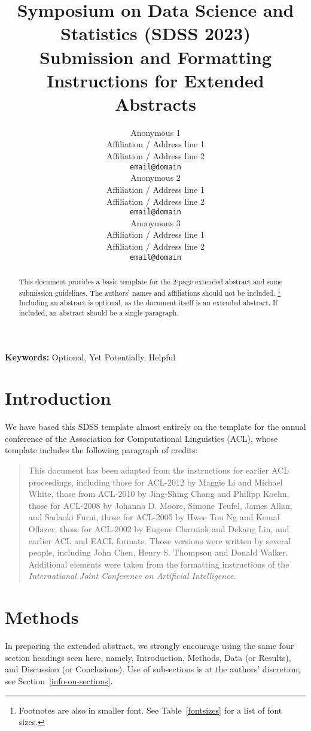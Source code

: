 \documentclass[10pt]{article}
\title{Symposium on Data Science and Statistics (SDSS 2023) \\
Submission and Formatting Instructions for Extended Abstracts}
\author{
  Anonymous 1 \\
  Affiliation / Address line 1 \\
  Affiliation / Address line 2 \\
  {\tt email@domain} \\\And
 Anonymous 2 \\
  Affiliation / Address line 1 \\
  Affiliation / Address line 2 \\
  {\tt email@domain} \\\And
  Anonymous 3 \\
  Affiliation / Address line 1 \\
  Affiliation / Address line 2 \\
  {\tt email@domain} \\}
\date{}
\begin{document}
\maketitle
\begin{abstract}
This document provides a basic template for the 2-page extended abstract
and some submission guidelines. The authors' names and affiliations should not be included. \footnote{Footnotes are also in smaller font.
See Table~\ref{fontsizes} for a list of font sizes.}
Including an abstract is optional, as the document itself is an extended abstract.
If included, an abstract should be a single paragraph.
\end{abstract}

{\bf Keywords:} Optional, Yet Potentially, Helpful

\section{Introduction}

We have based this SDSS template almost entirely on the template for
the annual conference of the Association for Computational Linguistics (ACL), whose
template includes the following paragraph of credits:
\begin{quotation}
\small %
This document has been adapted from the instructions for earlier ACL
proceedings, including those for ACL-2012 by Maggie Li and Michael
White, those from ACL-2010 by Jing-Shing Chang and Philipp Koehn,
those for ACL-2008 by Johanna D. Moore, Simone Teufel, James Allan,
and Sadaoki Furui, those for ACL-2005 by Hwee Tou Ng and Kemal
Oflazer, those for ACL-2002 by Eugene Charniak and Dekang Lin, and
earlier ACL and EACL formats. Those versions were written by several
people, including John Chen, Henry S. Thompson and Donald
Walker. Additional elements were taken from the formatting
instructions of the {\em International Joint Conference on Artificial
  Intelligence}.
\end{quotation}

\section{Methods}

In preparing the extended abstract,
we strongly encourage using the same four section headings seen here, namely,
Introduction, Methods, Data (or Results), and Discussion (or Conclusions).
Use of subsections is at the authors' discretion; see Section~\ref{info-on-sections}.
\end{document}
